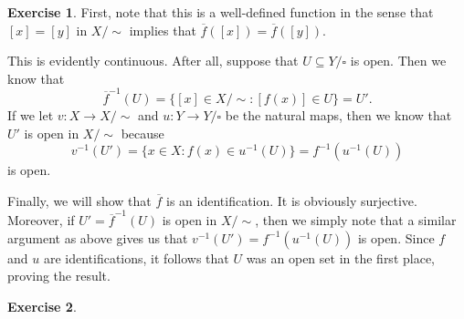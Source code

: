 \documentclass{article}
\theoremstyle{definition}
\newtheorem{intex}{Exercise}[section]
\newenvironment{exercise}{\begin{intex}\label{\theintex}}{\end{intex}}
\newcommand{\ecls}{%
  {\sim}%
}
\begin{document}
\begin{exercise} \leavevmode
First, note that this is a well-defined function in the sense that $[x]=[y]$ in $X/\ecls$ implies that $\overline f([x])=\overline f([y])$. 

This is evidently continuous. After all, suppose that $U\subseteq Y/\square$ is open. Then we know that \[\overline f^{-1}(U)=\{[x]\in X/\ecls:[f(x)]\in U\}=U'.\] If we let $v:X\to X/\ecls$ and $u:Y\to Y/\square$ be the natural maps, then we know that $U'$ is open in $X/\ecls$ because \[v^{-1}(U')=\{x\in X:f(x)\in u^{-1}(U)\}=f^{-1}(u^{-1}(U))\] is open. 

Finally, we will show that $\overline f$ is an identification. It is obviously surjective. Moreover, if $U'=\overline f^{-1}(U)$ is open in $X/\ecls$, then we simply note that a similar argument as above gives us that $v^{-1}(U')=f^{-1}(u^{-1}(U))$ is open. Since $f$ and $u$ are identifications, it follows that $U$ was an open set in the first place, proving the result. 
\end{exercise} 

\begin{exercise} \leavevmode

\end{exercise} 
\end{document}
